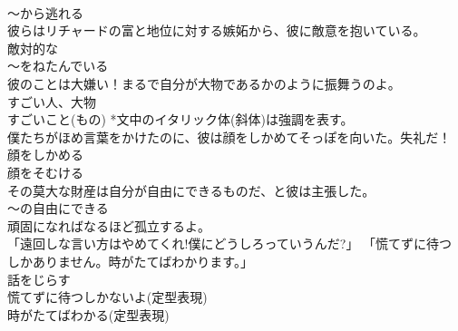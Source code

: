 \documentclass[8pt]{extreport}
\begin{document}
\begin{CJK}{UTF8}{min}
\\	～から逃れる
\\	彼らはリチャードの富と地位に対する嫉妬から、彼に敵意を抱いている。	
\\	敵対的な 
\\	～をねたんでいる
\\	彼のことは大嫌い！まるで自分が大物であるかのように振舞うのよ。	
\\	すごい人、大物 　
\\	すごいこと(もの) *文中のイタリック体(斜体)は強調を表す。
\\	僕たちがほめ言葉をかけたのに、彼は顔をしかめてそっぽを向いた。失礼だ！	
\\	顔をしかめる 
\\	顔をそむける
\\	その莫大な財産は自分が自由にできるものだ、と彼は主張した。	
\\	～の自由にできる
\\	頑固になればなるほど孤立するよ。	
\\	「遠回しな言い方はやめてくれ!僕にどうしろっていうんだ?」 「慌てずに待つしかありません。時がたてばわかります。」	
\\	話をじらす 
\\	慌てずに待つしかないよ(定型表現) 
\\	時がたてばわかる(定型表現)
\end{CJK}
\end{document}
